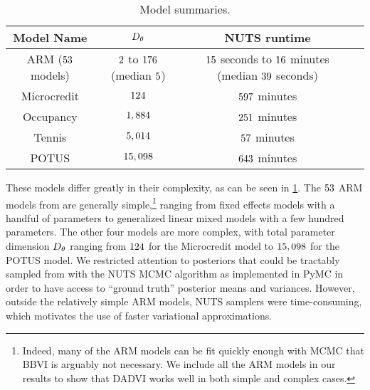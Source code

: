\begin{table}[h!]
\begin{tabular}{|c|c|c|c|}
\hline\hline
Model Name  &   $D_{\theta}$     & NUTS runtime \\
\hline\hline
ARM ($53$ models) &
$2$ to $176$ (median $5$)&
$15$ seconds to $16$
    minutes (median $39$ seconds) \\
\hline
Microcredit & $124$ & $597$ minutes\\
\hline
Occupancy & $1,884$ & $251$ minutes\\
\hline
Tennis & $5,014$ & $57$ minutes\\
\hline
POTUS & $15,098$ & $643$ minutes\\
\hline\hline
\end{tabular}
\caption{Model summaries.}
\label{tab:model_desc}
\end{table}

These models differ greatly in their complexity, as can be seen in
\cref{tab:model_desc}. The $53$ ARM models from
\cite{gelman:2006:arm} are generally simple,\footnote{Indeed, many of the ARM
models can be fit quickly enough with MCMC that BBVI is arguably not necessary.
We include all the ARM models in our results to show that DADVI works well in
both simple and complex cases.} ranging from fixed effects models with a handful
of parameters to generalized linear mixed models with a few hundred parameters.
The other four models are more complex, with total parameter dimension
$D_{\theta}$ ranging from $124$ for the Microcredit model to
$15,098$ for the POTUS model. We restricted attention to posteriors that
could be tractably sampled from with the NUTS MCMC algorithm
\citep{hoffman:2014:nuts} as implemented in PyMC \citep{salvatier:2016:pymc3} in
order to have access to ``ground truth'' posterior means and variances. However,
outside the relatively simple ARM models, NUTS samplers were time-consuming,
which motivates the use of faster variational approximations.

